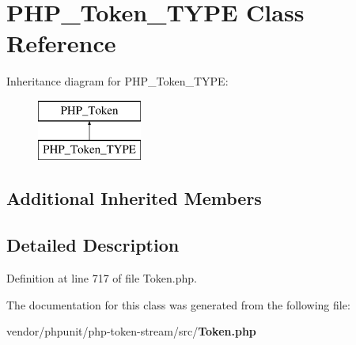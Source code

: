 \section{P\+H\+P\+\_\+\+Token\+\_\+\+T\+Y\+P\+E Class Reference}
\label{class_p_h_p___token___t_y_p_e}
Inheritance diagram for P\+H\+P\+\_\+\+Token\+\_\+\+T\+Y\+P\+E\+:\begin{figure}[H]
\begin{center}
\leavevmode
\includegraphics[height=2.000000cm]{class_p_h_p___token___t_y_p_e}
\end{center}
\end{figure}
\subsection*{Additional Inherited Members}


\subsection{Detailed Description}


Definition at line 717 of file Token.\+php.



The documentation for this class was generated from the following file\+:\begin{DoxyCompactItemize}
\item 
vendor/phpunit/php-\/token-\/stream/src/{\bf Token.\+php}\end{DoxyCompactItemize}
